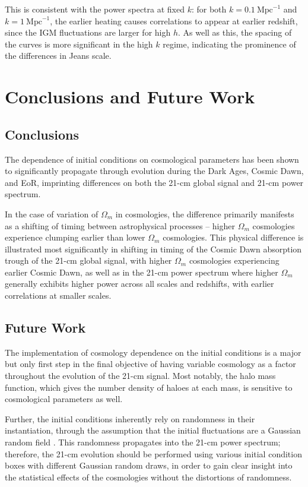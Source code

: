 \documentclass[floats,floatfix,showpacs,amssymb,prd,superscriptaddress,nofootinbib]{revtex4-2} %
\begin{document}
This is consistent with the power spectra at fixed $k$: for both $k = 0.1 ~\text{Mpc}^{-1}$ and $k = 1 ~\text{Mpc}^{-1}$, the earlier heating causes correlations to appear at earlier redshift, since the IGM fluctuations are larger for high $h$. As well as this, the spacing of the curves is more significant in the high $k$ regime, indicating the prominence of the differences in Jeans scale.

\section{Conclusions and Future Work}
\subsection{Conclusions}
The dependence of initial conditions on cosmological parameters has been shown to significantly propagate through evolution during the Dark Ages, Cosmic Dawn, and EoR, imprinting differences on both the 21-cm global signal and 21-cm power spectrum. 

In the case of variation of $\Omega_m$ in cosmologies, the difference primarily manifests as a shifting of timing between astrophysical processes -- higher $\Omega_m$ cosmologies experience clumping earlier than lower $\Omega_m$ cosmologies. This physical difference is illustrated most significantly in shifting in timing of the Cosmic Dawn absorption trough of the 21-cm global signal, with higher $\Omega_m$ cosmologies experiencing earlier Cosmic Dawn, as well as in the 21-cm power spectrum where higher $\Omega_m$ generally exhibits higher power across all scales and redshifts, with earlier correlations at smaller scales.
\subsection{Future Work}
The implementation of cosmology dependence on the initial conditions is a major but only first step in the final objective of having variable cosmology as a factor throughout the evolution of the 21-cm signal. Most notably, the halo mass function, which gives the number density of haloes at each mass, is sensitive to cosmological parameters as well. 

Further, the initial conditions inherently rely on randomness in their instantiation, through the assumption that the initial fluctuations are a Gaussian random field \citep{Guth_Pi_1982, Brandenberger_1985}. This randomness propagates into the 21-cm power spectrum; therefore, the 21-cm evolution should be performed using various initial condition boxes with different Gaussian random draws, in order to gain clear insight into the statistical effects of the cosmologies without the distortions of randomness.
\end{document}
